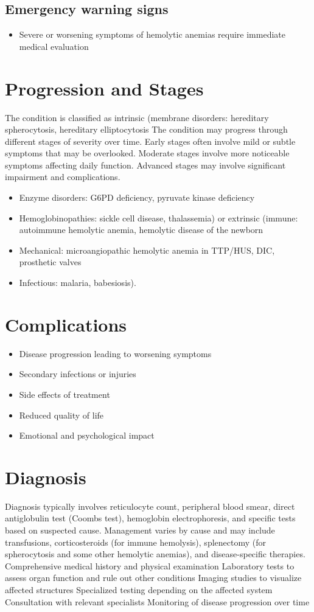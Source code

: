 \subsection{Emergency warning signs}
\begin{itemize}[noitemsep]
  \item Severe or worsening symptoms of hemolytic anemias require immediate medical evaluation
\end{itemize}
\section{Progression and Stages}
The condition is classified as intrinsic (membrane disorders: hereditary spherocytosis, hereditary elliptocytosis The condition may progress through different stages of severity over time. Early stages often involve mild or subtle symptoms that may be overlooked. Moderate stages involve more noticeable symptoms affecting daily function. Advanced stages may involve significant impairment and complications.

\begin{itemize}[noitemsep]
  \item Enzyme disorders: G6PD deficiency, pyruvate kinase deficiency
  \item Hemoglobinopathies: sickle cell disease, thalassemia) or extrinsic (immune: autoimmune hemolytic anemia, hemolytic disease of the newborn
  \item Mechanical: microangiopathic hemolytic anemia in TTP/HUS, DIC, prosthetic valves
  \item Infectious: malaria, babesiosis).
\end{itemize}
\section{Complications}
\begin{itemize}[noitemsep]
  \item Disease progression leading to worsening symptoms
  \item Secondary infections or injuries
  \item Side effects of treatment
  \item Reduced quality of life
  \item Emotional and psychological impact
\end{itemize}
\section{Diagnosis}
Diagnosis typically involves reticulocyte count, peripheral blood smear, direct antiglobulin test (Coombs test), hemoglobin electrophoresis, and specific tests based on suspected cause. Management varies by cause and may include transfusions, corticosteroids (for immune hemolysis), splenectomy (for spherocytosis and some other hemolytic anemias), and disease-specific therapies. Comprehensive medical history and physical examination Laboratory tests to assess organ function and rule out other conditions Imaging studies to visualize affected structures Specialized testing depending on the affected system Consultation with relevant specialists Monitoring of disease progression over time

